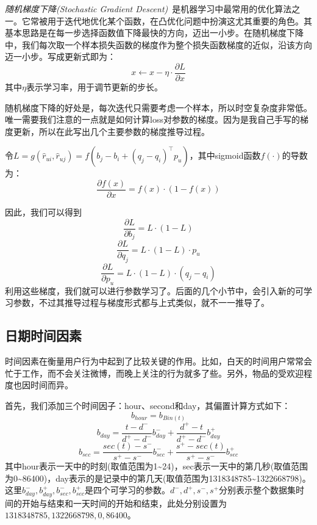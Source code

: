 \documentclass[12pt]{article} %
\newcommand\qq{\boldsymbol{\mathit{q}}}
\newcommand\pp{\boldsymbol{\mathit{p}}}
\begin{document}
\begin{sloppypar}
{\em 随机梯度下降(Stochastic Gradient Descent)}~\cite{robbins1951stochastic}是机器学习中最常用的优化算法之一。它常被用于迭代地优化某个函数，在凸优化问题中扮演这尤其重要的角色。其基本思路是在每一步选择函数值下降最快的方向，迈出一小步。在随机梯度下降中，我们每次取一个样本损失函数的梯度作为整个损失函数梯度的近似，沿该方向迈一小步。写成更新式即为：
\begin{equation}
	x \leftarrow x - \eta \cdot \frac{\partial L}{\partial x}
\end{equation}
其中$\eta$表示学习率，用于调节更新的步长。

随机梯度下降的好处是，每次迭代只需要考虑一个样本，所以时空复杂度非常低。唯一需要我们注意的一点就是如何计算loss对参数的梯度。因为是我自己手写的梯度更新，所以在此写出几个主要参数的梯度推导过程。

令$L = g(\hat{r}_{ui}, \hat{r}_{uj}) = f(b_j - b_i + (\qq_j - \qq_i)^\top \pp_u)$，其中sigmoid函数$f(\cdot)$的导数为：
\begin{equation}
\frac{\partial f(x)}{\partial x} = f(x) \cdot (1 - f(x))
\end{equation}

因此，我们可以得到
\begin{equation}
\frac{\partial L}{\partial b_j} = L \cdot (1 - L)
\end{equation}
\begin{equation}
\frac{\partial L}{\partial \qq_j} = L \cdot (1 - L) \cdot \pp_u
\end{equation}
\begin{equation}
\frac{\partial L}{\partial \pp_u} = L \cdot (1 - L) \cdot \left(\qq_j - \qq_i\right)
\end{equation}
利用这些梯度，我们就可以进行参数学习了。后面的几个小节中，会引入新的可学习参数，不过其推导过程与梯度形式都与上式类似，就不一一推导了。


\subsection{日期时间因素}

时间因素在衡量用户行为中起到了比较关键的作用。比如，白天的时间用户常常会忙于工作，而不会关注微博，而晚上关注的行为就多了些。另外，物品的受欢迎程度也因时间而异。

首先，我们添加三个时间因子：hour、second和day，其偏置计算方式如下：
\begin{equation}
	b_{hour} = b_{Bin(t)}
\end{equation}
\begin{equation}
	b_{day} = \frac{t - d^-}{d^+ - d^-} b_{day}^- + \frac{d^+ - t}{d^+ - d^-} b_{day}^+
\end{equation}
\begin{equation}
	b_{sec} = \frac{sec(t) - s^-}{s^+ - s^-} b_{sec}^- + \frac{s^+ - sec(t)}{s^+ - s^-} b_{sec}^+
\end{equation}
其中hour表示一天中的时刻(取值范围为1\~{}24)，sec表示一天中的第几秒(取值范围为0\~{}86400)，day表示的是记录中的第几天(取值范围为1318348785\~{}1322668798)。这里$b_{day}^-,b_{day}^+,b_{sec}^-,b_{sec}^+$是四个可学习的参数。$d^-,d^+,s^-,s^+$分别表示整个数据集时间的开始与结束和一天时间的开始和结束，此处分别设置为$1318348785,1322668798,0,86400$。


\end{sloppypar}
\end{document}
